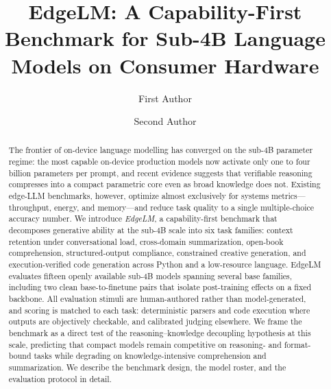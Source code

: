 \documentclass[runningheads]{llncs}
\begin{document}
%
\title{EdgeLM: A Capability-First Benchmark for Sub-4B Language Models on Consumer Hardware}
%
%
\author{First Author \and
Second Author}
%
%
%
\maketitle
%
\begin{abstract}
The frontier of on-device language modelling has converged on the sub-4B
parameter regime: the most capable on-device production models now activate
only one to four billion parameters per prompt, and recent evidence suggests
that verifiable reasoning compresses into a compact parametric core even as
broad knowledge does not. Existing edge-LLM benchmarks, however, optimize
almost exclusively for systems metrics---throughput, energy, and memory---and
reduce task quality to a single multiple-choice accuracy number. We introduce
\emph{EdgeLM}, a capability-first benchmark that decomposes generative ability
at the sub-4B scale into six task families: context retention under
conversational load, cross-domain summarization, open-book comprehension,
structured-output compliance, constrained creative generation, and
execution-verified code generation across Python and a low-resource language.
EdgeLM evaluates fifteen openly available sub-4B models spanning several base
families, including two clean base-to-finetune pairs that isolate post-training
effects on a fixed backbone. All evaluation stimuli are human-authored rather
than model-generated, and scoring is matched to each task: deterministic
parsers and code execution where outputs are objectively checkable, and
calibrated judging elsewhere. We frame the benchmark as a direct test of the
reasoning--knowledge decoupling hypothesis at this scale, predicting that
compact models remain competitive on reasoning- and format-bound tasks while
degrading on knowledge-intensive comprehension and summarization. We describe
the benchmark design, the model roster, and the evaluation protocol in detail.

\end{abstract}
%
\end{document}
